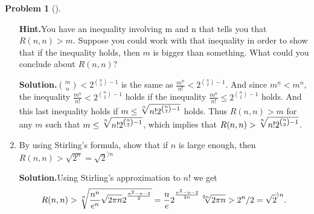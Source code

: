 \documentclass[10pt,]{book}
\theoremstyle{plain}
\theoremstyle{definition}
\newtheorem{activity}[project]{Problem}
\theoremstyle{definition}
\numberwithin{equation}{chapter}
\newcommand{\lt}{<}
\begin{document}
\begin{activity}[]
\begin{enumerate}[font=\bfseries,label=(\alph*),ref=\alph*]
\par\medskip\noindent%
\textbf{Hint.}\quad You have an inequality involving m and n that tells you that \(R(n, n) > m\). Suppose you could work with that inequality in order to show that if the inequality holds, then \(m\) is bigger than something. What could you conclude about \(R(n, n)\)?%
\par\medskip\noindent%
\textbf{Solution.}\quad \(\binom{m}{n} \lt 2^{\binom{n}{2}-1}\) is the same as \(\frac{m^{\underline{n}}}{n!}\lt 2^{\binom{n}{2}-1}\). And since \(m^{\underline{n}}\lt m^n\), the inequality \(\frac{m^{\underline{n}}}{n!}\lt  2^{\binom{n}{2}-1}\) holds if the inequality \(\frac{m^n}{n!}\le2^{\binom{n}{2}-1}\) holds. And this last inequality holds if \(m\le\root n
\of {n!2^{\binom{n}{2}-1}}\) holds. Thus \(R(n,n)>m\) for any \(m\) such that \(m\le\root n
\of {n!2^{\binom{n}{2}-1}}\), which implies that \(R(n,n)> \root n
\of {n!2^{\binom{n}{2}-1}}\).%
\item\label{task-82} By using Stirling's formula, show that if \(n\) is large enough, then \(R(n,n) > \sqrt{2^n} = \sqrt{2}^{\rangle n}\)%
\par\medskip\noindent%
\textbf{Solution.}\quad Using Stirling's approximation to \(n!\) we get%
\begin{equation*}
R(n,n)>\root n \of
{\frac{n^n}{e^n}\sqrt{2\pi n}2^{^\frac{n^2-n-2}{2}}}=\frac{n}{e}2^{^\frac{n^2-n-2}{2n}}\root 2n \of{2\pi
n}>2^n/2=\sqrt{2}^{\rangle n}.
\end{equation*}
%
\end{enumerate}
\end{activity}
\typeout{************************************************}
\typeout{************************************************}
\end{document}

